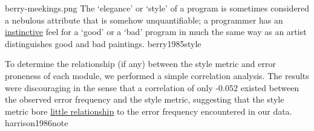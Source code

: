\documentclass{article}
\begin{document}
\qte
  {berry-meekings.png}
  {The `elegance' or `style' of a program is sometimes considered a nebulous attribute that is somehow unquantifiable; a programmer has an \ul{instinctive} feel for a `good' or a `bad' program in much the same way as an artist distinguishes good and bad paintings.}
  {berry1985style}

  {To determine the relationship (if any) between the style metric and error proneness of each module, we performed a simple correlation analysis. The results were discouraging in the sense that a correlation of only -0.052 existed between the observed error frequency and the style metric, suggesting that the style metric bore \ul{little relationship} to the error frequency encountered in our data.}
  {harrison1986note}
\end{document}
